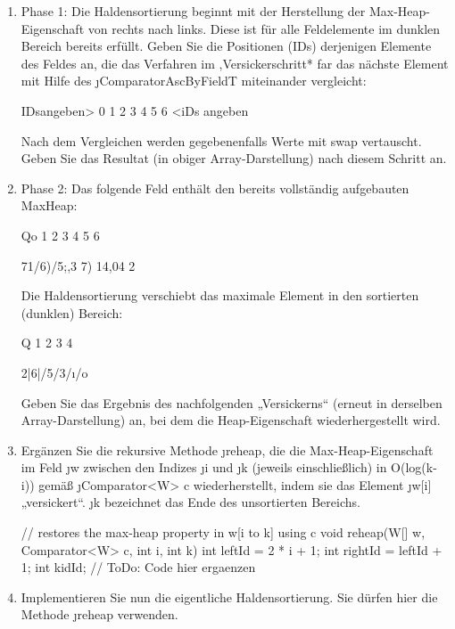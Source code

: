 \documentclass{bschlangaul-aufgabe}
\begin{document}
\begin{enumerate}


\item Phase 1: Die Haldensortierung beginnt mit der Herstellung der
Max-Heap-Eigenschaft von rechts nach links. Diese ist für alle
Feldelemente im dunklen Bereich bereits erfüllt. Geben Sie die
Positionen (IDs) derjenigen Elemente des Feldes an, die das Verfahren im
,Versickerschritt* far das nächste Element mit Hilfe des
\j{ComparatorAscByFieldT} miteinander vergleicht:

IDsangeben> 0 1 2 3 4 5 6 <iDs angeben

Nach dem Vergleichen werden gegebenenfalls Werte mit swap vertauscht.
Geben Sie das Resultat (in obiger Array-Darstellung) nach diesem Schritt
an.


\item Phase 2: Das folgende Feld enthält den bereits vollständig
aufgebauten MaxHeap:

Qo 1 2 3 4 5 6

71/6)/5;,3 7) 14,04 2

Die Haldensortierung verschiebt das maximale Element in den sortierten
(dunklen) Bereich:

Q 1 2 3 4

2|6|/5/3/ı/o

Geben Sie das Ergebnis des nachfolgenden „Versickerns“ (erneut in
derselben Array-Darstellung) an, bei dem die Heap-Eigenschaft
wiederhergestellt wird.


\item Ergänzen Sie die rekursive Methode \j{reheap}, die die
Max-Heap-Eigenschaft im Feld \j{w} zwischen den Indizes \j{i} und \j{k}
(jeweils einschließlich) in O(log(k-i)) gemäß \j{Comparator<W> c}
wiederherstellt, indem sie das Element \j{w[i]} „versickert“. \j{k}
bezeichnet das Ende des unsortierten Bereichs.

\begin{liJavaAngabe}
// restores the max-heap property in w[i to k] using c
void reheap(W[] w, Comparator<W> c, int i, int k) {
  int leftId = 2 * i + 1;
  int rightId = leftId + 1;
  int kidId;
  // ToDo: Code hier ergaenzen
}
\end{liJavaAngabe}


\item Implementieren Sie nun die eigentliche Haldensortierung. Sie
dürfen hier die Methode \j{reheap} verwenden.


\end{enumerate}
\end{document}
